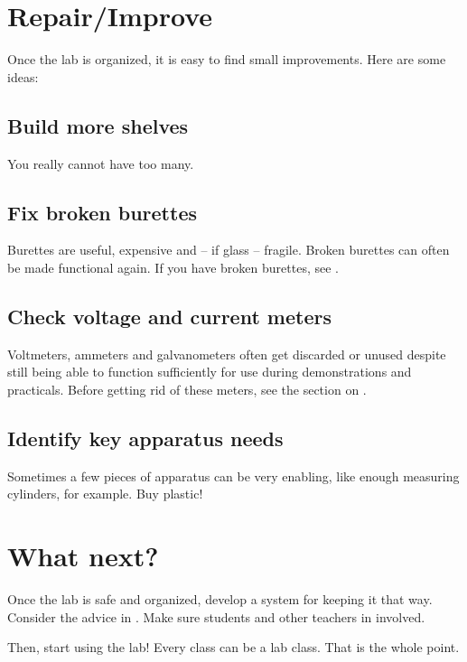 \section{Repair/Improve}

Once the lab is organized, 
it is easy to find small improvements. 
Here are some ideas:

\subsection{Build more shelves}
You really cannot have too many.

\subsection{Fix broken burettes}
Burettes are useful, 
expensive and -- if glass -- fragile. 
Broken burettes can often be made functional again. 
If you have broken burettes, 
see .

\subsection{Check voltage and current meters}
Voltmeters, ammeters and galvanometers often get discarded or unused despite still being able to function sufficiently for use during demonstrations and practicals. Before getting rid of these meters, see the section on .

\subsection{Identify key apparatus needs}
Sometimes a few pieces of apparatus can be very enabling, 
like enough measuring cylinders, 
for example. 
Buy plastic!

\section{What next?}

Once the lab is safe and organized, 
develop a system for keeping it that way. 
Consider the advice in . 
Make sure students and other teachers in involved.

Then, 
start using the lab! Every class can be a lab class. 
That is the whole point.
